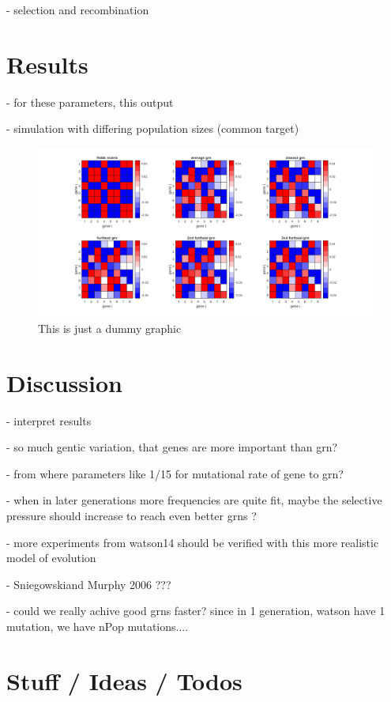 \documentclass{article}
\begin{document}
- selection and recombination



\section{Results}

- for these parameters, this output

- simulation with differing population sizes (common target)

\begin{figure}[H]
	\includegraphics[width=\linewidth]{./img/dummy.jpg}
	\caption{This is just a dummy graphic}
	\label{fig:dummy}
\end{figure}


\section{Discussion}

- interpret results

- so much gentic variation, that genes are more important than grn?

- from where parameters like 1/15 for mutational rate of gene to grn?

- when in later generations more frequencies are quite fit, maybe the selective pressure should increase to reach even better grns ?

- more experiments from watson14 should be verified with this more realistic model of evolution

- Sniegowskiand Murphy 2006 ???

- could we really achive good grns faster? since in 1 generation, watson have 1 mutation, we have nPop mutations.... 


\section{Stuff / Ideas / Todos}
\end{document}
